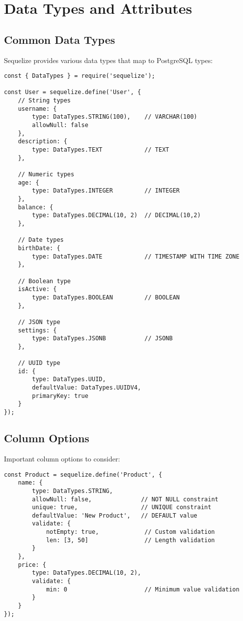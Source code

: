 \documentclass[12pt,a4paper]{book}
\begin{document}
	\section{Data Types and Attributes}
	
	\subsection{Common Data Types}
	Sequelize provides various data types that map to PostgreSQL types:
	
	\begin{verbatim}
const { DataTypes } = require('sequelize');

const User = sequelize.define('User', {
	// String types
	username: {
		type: DataTypes.STRING(100),    // VARCHAR(100)
		allowNull: false
	},
	description: {
		type: DataTypes.TEXT            // TEXT
	},
	
	// Numeric types
	age: {
		type: DataTypes.INTEGER         // INTEGER
	},
	balance: {
		type: DataTypes.DECIMAL(10, 2)  // DECIMAL(10,2)
	},
	
	// Date types
	birthDate: {
		type: DataTypes.DATE            // TIMESTAMP WITH TIME ZONE
	},
	
	// Boolean type
	isActive: {
		type: DataTypes.BOOLEAN         // BOOLEAN
	},
	
	// JSON type
	settings: {
		type: DataTypes.JSONB           // JSONB
	},
	
	// UUID type
	id: {
		type: DataTypes.UUID,
		defaultValue: DataTypes.UUIDV4,
		primaryKey: true
	}
});
	\end{verbatim}
	
	\subsection{Column Options}
	Important column options to consider:
	
	\begin{verbatim}
const Product = sequelize.define('Product', {
	name: {
		type: DataTypes.STRING,
		allowNull: false,              // NOT NULL constraint
		unique: true,                  // UNIQUE constraint
		defaultValue: 'New Product',   // DEFAULT value
		validate: {
			notEmpty: true,             // Custom validation
			len: [3, 50]                // Length validation
		}
	},
	price: {
		type: DataTypes.DECIMAL(10, 2),
		validate: {
			min: 0                      // Minimum value validation
		}
	}
});
	\end{verbatim}
	
\end{document}
